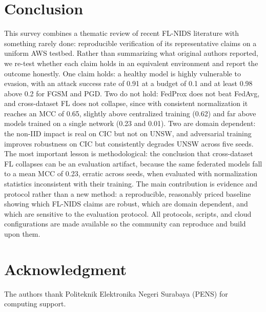 \documentclass[conference]{IEEEtran}
\begin{document}
\section{Conclusion}
This survey combines a thematic review of recent FL-NIDS literature with something rarely
done: reproducible verification of its representative claims on a uniform AWS testbed. Rather
than summarizing what original authors reported, we re-test whether each claim holds in an
equivalent environment and report the outcome honestly. One claim holds: a healthy model is
highly vulnerable to evasion, with an attack success rate of 0.91 at a budget of 0.1 and at
least 0.98 above 0.2 for FGSM and PGD. Two do not hold: FedProx does not beat FedAvg, and
cross-dataset FL does not collapse, since with consistent normalization it reaches an MCC of
0.65, slightly above centralized training (0.62) and far above models trained on a single
network (0.23 and 0.01). Two are domain dependent: the non-IID impact is real on CIC but not on
UNSW, and adversarial training improves robustness on CIC but consistently degrades UNSW across
five seeds. The most important lesson is methodological: the conclusion that cross-dataset FL
collapses can be an evaluation artifact, because the same federated models fall to a mean MCC of
0.23, erratic across seeds, when evaluated with normalization statistics inconsistent with their
training. The main contribution is evidence and protocol rather than a new method: a
reproducible, reasonably priced baseline showing which FL-NIDS claims are robust, which are
domain dependent, and which are sensitive to the evaluation protocol. All protocols, scripts,
and cloud configurations are made available so the community can reproduce and build upon
them.

\section*{Acknowledgment}
The authors thank Politeknik Elektronika Negeri Surabaya (PENS) for computing support.
\end{document}
